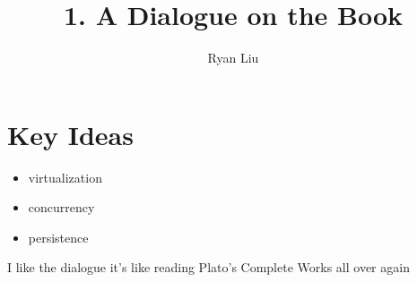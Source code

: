 \documentclass{article}
\title{1. A Dialogue on the Book}
\author{Ryan Liu}
\begin{document}
\maketitle
\thispagestyle{empty}
\newpage
{}

\section{Key Ideas}

\begin{itemize}
    \item virtualization
    \item concurrency
    \item persistence
\end{itemize}

I like the dialogue it's like reading Plato's Complete Works all over again
\end{document}

